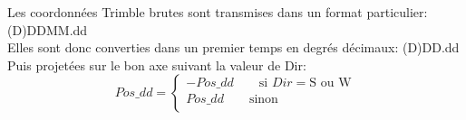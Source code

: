 Les coordonn\'ees Trimble brutes sont transmises dans un format particulier: (D)DDMM.dd\\
Elles sont donc converties dans un premier temps en degr\'es d\'ecimaux: (D)DD.dd\\
Puis projet\'ees sur le bon axe suivant la valeur de Dir:
\[
Pos\_dd = 
\begin{cases}
- Pos\_dd \qquad \text{si   } Dir = \text{S ou W}\\
  Pos\_dd \qquad \text{sinon}\\
\end{cases}
\]
